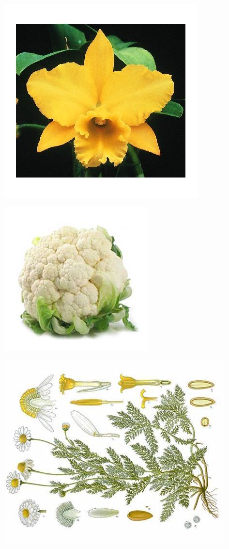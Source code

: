 \documentclass{article}
\begin{document}
\begin{center}
\includegraphics[height=0.925\paperheight]{../Cattleya3.jpg}
\end{center}
\newpage

\begin{center}
\includegraphics[height=0.925\paperheight]{../Cauliflower.jpg}
\end{center}
\newpage

\begin{center}
\includegraphics[height=0.925\paperheight]{../Chamomile.jpg}
\end{center}
\newpage
\end{document}
